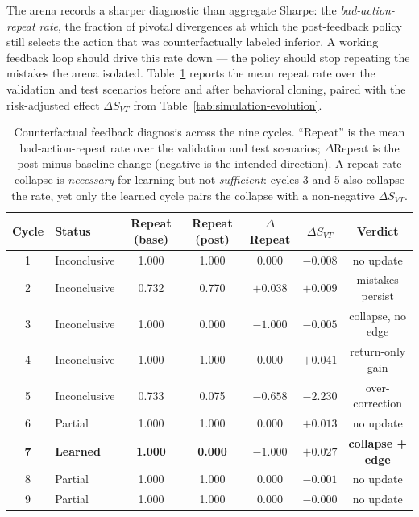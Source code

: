 \documentclass[10pt]{article}
\begin{document}
The arena records a sharper diagnostic than aggregate Sharpe: the
\emph{bad-action-repeat rate}, the fraction of pivotal divergences at which the post-feedback
policy still selects the action that was counterfactually labeled inferior. A working feedback
loop should drive this rate down --- the policy should stop repeating the mistakes the arena
isolated. Table~\ref{tab:repeat-rate} reports the mean repeat rate over the validation and test
scenarios before and after behavioral cloning, paired with the risk-adjusted effect
\(\Delta S_{VT}\) from Table~\ref{tab:simulation-evolution}.

\begin{table}[htbp]
	\centering
	\small
	\caption{Counterfactual feedback diagnosis across the nine cycles. ``Repeat'' is the mean
		bad-action-repeat rate over the validation and test scenarios; \(\Delta\)Repeat is the
		post-minus-baseline change (negative is the intended direction). A repeat-rate collapse is
		\emph{necessary} for learning but not \emph{sufficient}: cycles 3 and 5 also collapse the
		rate, yet only the learned cycle pairs the collapse with a non-negative \(\Delta S_{VT}\).}
	\label{tab:repeat-rate}
	\begin{tabular}{clccccc}
		\toprule
		Cycle & Status & Repeat (base) & Repeat (post) & \(\Delta\)Repeat & \(\Delta S_{VT}\) & Verdict \\
		\midrule
		1 & Inconclusive & 1.000 & 1.000 & \(0.000\)  & \(-0.008\) & no update \\
		2 & Inconclusive & 0.732 & 0.770 & \(+0.038\) & \(+0.009\) & mistakes persist \\
		3 & Inconclusive & 1.000 & 0.000 & \(-1.000\) & \(-0.005\) & collapse, no edge \\
		4 & Inconclusive & 1.000 & 1.000 & \(0.000\)  & \(+0.041\) & return-only gain \\
		5 & Inconclusive & 0.733 & 0.075 & \(-0.658\) & \(-2.230\) & over-correction \\
		6 & Partial      & 1.000 & 1.000 & \(0.000\)  & \(+0.013\) & no update \\
		\textbf{7} & \textbf{Learned} & \textbf{1.000} & \textbf{0.000} & \(\mathbf{-1.000}\) & \(\mathbf{+0.027}\) & \textbf{collapse + edge} \\
		8 & Partial      & 1.000 & 1.000 & \(0.000\)  & \(-0.001\) & no update \\
		9 & Partial      & 1.000 & 1.000 & \(0.000\)  & \(-0.000\) & no update \\
		\bottomrule
	\end{tabular}
\end{table}
\end{document}
